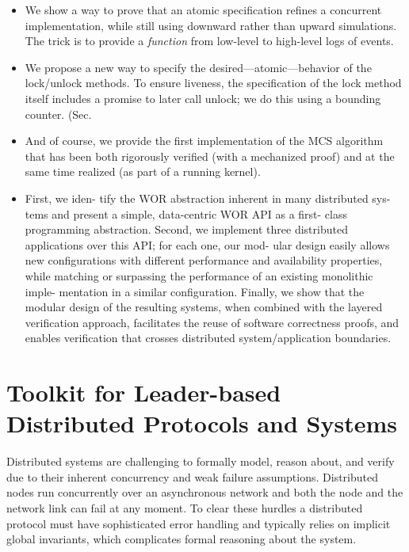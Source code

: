 \begin{itemize}
\item We show a way to prove that an atomic specification refines a concurrent implementation, while still using downward rather than upward simulations. The trick is to provide a \emph{function} from low-level to high-level logs of events. 
\item We propose a new way to specify the desired---atomic---behavior of the lock/unlock methods. To ensure liveness, the specification of the lock method itself includes a promise to later call unlock; we do this using a bounding counter. (Sec.~

\item And of course, we provide the first implementation of the MCS algorithm that has been both rigorously verified (with a mechanized proof) and at the same time realized (as part of a running kernel).
\end{itemize}


\begin{itemize}
\item First, we iden- tify the WOR abstraction inherent in many distributed sys- tems and present a simple, data-centric WOR API as a first- class programming abstraction. Second, we implement three distributed applications over this API; for each one, our mod- ular design easily allows new configurations with different performance and availability properties, while matching or surpassing the performance of an existing monolithic imple- mentation in a similar configuration. Finally, we show that the modular design of the resulting systems, when combined with the layered verification approach, facilitates the reuse of software correctness proofs, and enables verification that crosses distributed system/application boundaries.
\end{itemize}


\section{Toolkit for Leader-based Distributed Protocols and Systems}
\label{chapter:introduction:sec:toolkit-for-leader-based-distributed-protocols-and-systems}

Distributed systems are challenging to formally model, reason about, and verify
due to their inherent concurrency and weak failure assumptions. Distributed
nodes run concurrently over an asynchronous network and both the node and the
network link can fail at any moment. To clear these hurdles a distributed
protocol must have sophisticated error handling and typically relies on implicit
global invariants, which complicates formal reasoning about the system.


